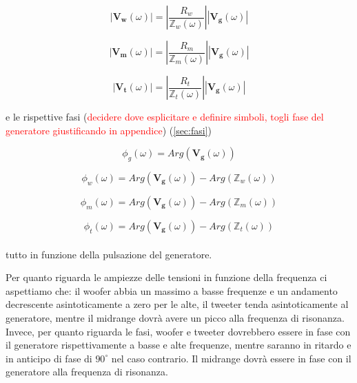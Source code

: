 \documentclass[12pt,italian]{article}
\newcommand{\err}[1]{\textcolor{red}{#1}}
\begin{document}
\begin{equation}
	\left| \mathbf{V_{w}}(\omega) \right| = \left| \frac{R_{w}}
	{\mathbb{Z}_{w}(\omega)}\right|\left| \mathbf{V_{g}}(\omega) \right|
	\label{eq:Vw}
\end{equation}

\begin{equation}
	\left| \mathbf{V_{m}}(\omega) \right| = \left| \frac{R_{m}}
	{\mathbb{Z}_{m}(\omega)}\right|\left| \mathbf{V_{g}}(\omega) \right|
	\label{eq:Vm}
\end{equation}

\begin{equation}
	\left| \mathbf{V_{t}}(\omega) \right| = \left| \frac{R_{t}}
	{\mathbb{Z}_{t}(\omega)}\right|\left| \mathbf{V_{g}}(\omega) \right|
	\label{eq:Vt}
\end{equation}

\noindent
e le rispettive fasi (\err{decidere dove esplicitare e definire simboli, togli fase del generatore giustificando in appendice}) (\ref{sec:fasi})

\begin{equation}
	\phi_{g}(\omega) = Arg(\mathbf{V_{g}}(\omega))
\end{equation}

\begin{equation}
	\phi_{w}(\omega) = Arg(\mathbf{V_{g}}(\omega)) - Arg(\mathbb{Z}_{w}(\omega))
\end{equation}

\begin{equation}
	\phi_{m}(\omega) = Arg(\mathbf{V_{g}}(\omega)) - Arg(\mathbb{Z}_{m}(\omega))
\end{equation}

\begin{equation}
	\phi_{t}(\omega) =  Arg(\mathbf{V_{g}}(\omega)) - Arg(\mathbb{Z}_{t}(\omega))
\end{equation}
\\
tutto in funzione della pulsazione del generatore.

Per quanto riguarda le ampiezze delle tensioni in funzione della frequenza ci
aspettiamo che: il woofer abbia un massimo a basse frequenze e un andamento
decrescente asintoticamente a zero per le alte, il tweeter tenda
asintoticamente al generatore, mentre il midrange dovrà avere un picco alla
frequenza di risonanza. Invece, per quanto riguarda le fasi, woofer e tweeter
dovrebbero essere in fase con il generatore rispettivamente a basse e alte
frequenze, mentre saranno in ritardo e in anticipo di fase di $90^\circ$ nel
caso contrario. Il midrange dovrà essere in fase con il generatore alla
frequenza di risonanza.
\end{document}
